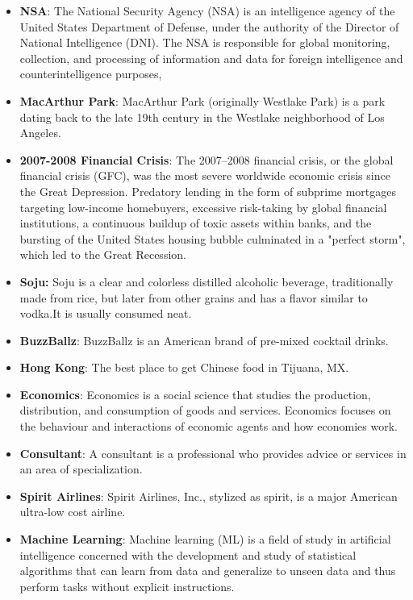 \documentclass[10pt]{article}
\begin{document}
\begin{multicols}{2}
\begin{itemize}
        \item \textbf{NSA}: The National Security Agency (NSA) is an intelligence agency of the United States Department of Defense, under the authority of the Director of National Intelligence (DNI). The NSA is responsible for global monitoring, collection, and processing of information and data for foreign intelligence and counterintelligence purposes,
    
    \item \textbf{MacArthur Park}: MacArthur Park (originally Westlake Park) is a park dating back to the late 19th century in the Westlake neighborhood of Los Angeles.
        
    \item \textbf{2007-2008 Financial Crisis}: The 2007–2008 financial crisis, or the global financial crisis (GFC), was the most severe worldwide economic crisis since the Great Depression. Predatory lending in the form of subprime mortgages targeting low-income homebuyers, excessive risk-taking by global financial institutions, a continuous buildup of toxic assets within banks, and the bursting of the United States housing bubble culminated in a "perfect storm", which led to the Great Recession. 
    
    \item \textbf{Soju:} Soju is a clear and colorless distilled alcoholic beverage, traditionally made from rice, but later from other grains and has a flavor similar to vodka.It is usually consumed neat.
    
    \item \textbf{BuzzBallz}: BuzzBallz is an American brand of pre-mixed cocktail drinks. 
    
    \item \textbf{Hong Kong}: The best place to get Chinese food in Tijuana, MX. 
        
    \item \textbf{Economics}: Economics is a social science that studies the production, distribution, and consumption of goods and services. Economics focuses on the behaviour and interactions of economic agents and how economies work. 
    
    \item \textbf{Consultant}: A consultant is a professional who provides advice or services in an area of specialization.
        
    \item \textbf{Spirit Airlines}: Spirit Airlines, Inc., stylized as spirit, is a major American ultra-low cost airline.
    

    \item \textbf{Machine Learning}: Machine learning (ML) is a field of study in artificial intelligence concerned with the development and study of statistical algorithms that can learn from data and generalize to unseen data and thus perform tasks without explicit instructions.
\end{itemize}
\end{multicols}
\end{document}
